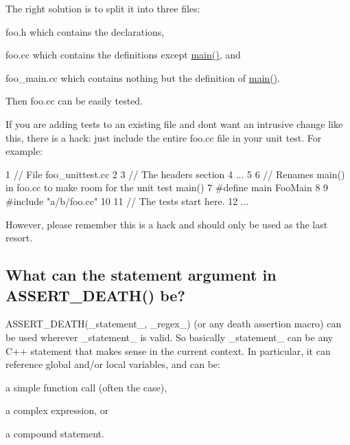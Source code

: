 The right solution is to split it into three files\+:
\begin{DoxyEnumerate}
\item {\ttfamily foo.\+h} which contains the declarations,
\end{DoxyEnumerate}
\begin{DoxyEnumerate}
\item {\ttfamily foo.\+cc} which contains the definitions except {\ttfamily \hyperlink{app_2main_8cpp_ae66f6b31b5ad750f1fe042a706a4e3d4}{main()}}, and
\end{DoxyEnumerate}
\begin{DoxyEnumerate}
\item {\ttfamily foo\+\_\+main.\+cc} which contains nothing but the definition of {\ttfamily \hyperlink{app_2main_8cpp_ae66f6b31b5ad750f1fe042a706a4e3d4}{main()}}.
\end{DoxyEnumerate}

Then {\ttfamily foo.\+cc} can be easily tested.

If you are adding tests to an existing file and don\textquotesingle{}t want an intrusive change like this, there is a hack\+: just include the entire {\ttfamily foo.\+cc} file in your unit test. For example\+: 
\begin{DoxyCode}
1 // File foo\_unittest.cc
2 
3 // The headers section
4 ...
5 
6 // Renames main() in foo.cc to make room for the unit test main()
7 #define main FooMain
8 
9 #include "a/b/foo.cc"
10 
11 // The tests start here.
12 ...
\end{DoxyCode}


However, please remember this is a hack and should only be used as the last resort.

\subsection*{What can the statement argument in A\+S\+S\+E\+R\+T\+\_\+\+D\+E\+A\+T\+H() be?}

{\ttfamily A\+S\+S\+E\+R\+T\+\_\+\+D\+E\+A\+T\+H(\+\_\+statement\+\_\+, \+\_\+regex\+\_\+)} (or any death assertion macro) can be used wherever {\ttfamily \+\_\+statement\+\_\+} is valid. So basically {\ttfamily \+\_\+statement\+\_\+} can be any C++ statement that makes sense in the current context. In particular, it can reference global and/or local variables, and can be\+:
\begin{DoxyItemize}
\item a simple function call (often the case),
\item a complex expression, or
\item a compound statement.
\end{DoxyItemize}

